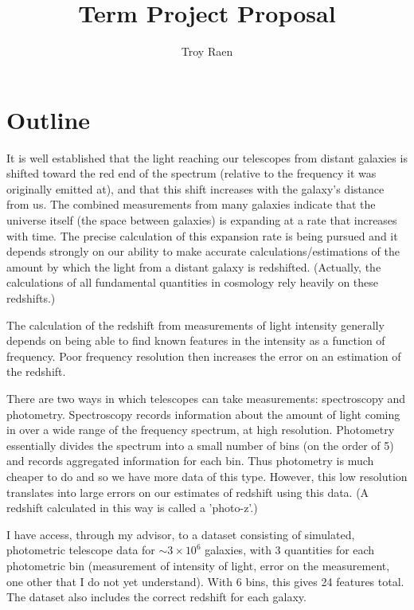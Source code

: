 \documentclass[13pt]{amsart}
\title{Term Project Proposal}
\author{Troy Raen}
\begin{document}
\maketitle


\section{Outline}

It is well established that the light reaching our telescopes from distant galaxies is shifted toward the red end of the spectrum (relative to the frequency it was originally emitted at), and that this shift increases with the galaxy's distance from us. The combined measurements from many galaxies indicate that the universe itself (the space between galaxies) is expanding at a rate that increases with time. The precise calculation of this expansion rate is being pursued and it depends strongly on our ability to make accurate calculations/estimations of the amount by which the light from a distant galaxy is redshifted. (Actually, the calculations of all fundamental quantities in cosmology rely heavily on these redshifts.)

The calculation of the redshift from measurements of light intensity generally depends on being able to find known features in the intensity as a function of frequency. Poor frequency resolution then increases the error on an estimation of the redshift.

There are two ways in which telescopes can take measurements: spectroscopy and photometry. Spectroscopy records information about the amount of light coming in over a wide range of the frequency spectrum, at high resolution. Photometry essentially divides the spectrum into a small number of bins (on the order of 5) and records aggregated information for each bin. Thus photometry is much cheaper to do and so we have more data of this type. However, this low resolution translates into large errors on our estimates of redshift using this data. (A redshift calculated in this way is called a 'photo-z'.)

I have access, through my advisor, to a dataset consisting of simulated, photometric telescope data for $\sim3 \times 10^{6}$ galaxies, with 3 quantities for each photometric bin (measurement of intensity of light, error on the measurement, one other that I do not yet understand). With 6 bins, this gives 24 features total. The dataset also includes the correct redshift for each galaxy.
\end{document}
